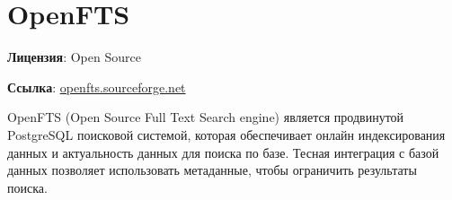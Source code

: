 \section{OpenFTS}
\textbf{Лицензия}: Open Source

\textbf{Ссылка}: \href{http://openfts.sourceforge.net/}{openfts.sourceforge.net}

OpenFTS (Open Source Full Text Search engine) является продвинутой PostgreSQL поисковой системой, которая обеспечивает онлайн индексирования данных и актуальность данных для поиска по базе. Тесная интеграция с базой данных позволяет использовать метаданные, чтобы ограничить результаты поиска.